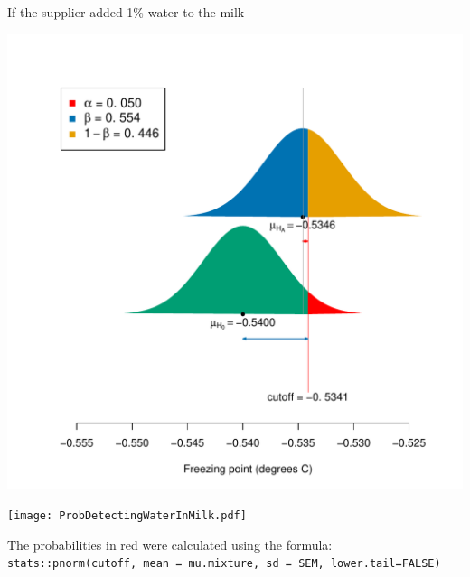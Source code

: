 \documentclass[10pt,handout]{beamer}\usepackage[]{graphicx}\usepackage[]{color}
\makeatletter
\def\maxwidth{ %
  \ifdim\Gin@nat@width>\linewidth
    \linewidth
  \else
    \Gin@nat@width
  \fi
}
\newenvironment{knitrout}{}{} %
\makeatother
\begin{document}
\begin{frame}[fragile]{If the supplier added 1\% water to the milk}
\begin{knitrout}\tiny
{}\color{fgcolor}

{\centering \includegraphics[width=\maxwidth]{figure/unnamed-chunk-37-1} 

}


\end{knitrout}
\end{frame}



\begin{frame}

\begin{center}
	\texttt{[image: ProbDetectingWaterInMilk.pdf]} 
\end{center}

\vspace*{-0.18in}

{ \footnotesize
	The probabilities in red were calculated using the formula:
	\texttt{stats::pnorm(cutoff, mean = mu.mixture, sd = SEM, lower.tail=FALSE)}
}
\end{frame}
\end{document}

